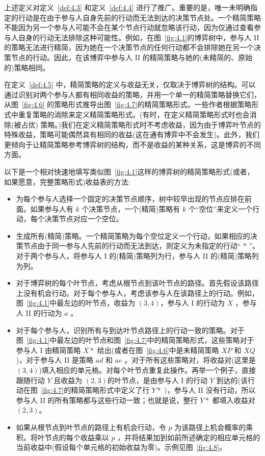 上述定义对定义~\ref{def:4.3} 和定义~\ref{def:4.4} 进行了推广。重要的是，唯一未明确指定的行动是在由于参与人自身先前的行动而无法到达的决策节点处。一个精简策略不能因为另一个参与人可能不会在某个节点行动就忽略该行动，因为仅通过查看参与人自身的行动无法排除这种可能性。例如，在图~\ref{fig:4.1}的博弈树中，参与人 II 的策略无法进行精简，因为她在一个决策节点的任何行动都不会排除她在另一个决策节点的行动。因此，在该博弈中参与人 II 的精简策略与她的(未精简的、原始的)策略相同。

在定义~\ref{def:4.5} 中，精简策略的定义与收益无关，仅取决于博弈树的结构。可以通过识别对两个参与人都有相同收益的策略，并用一个单一的精简策略替换它们，从图~\ref{fig:4.6} 的策略形式推导出图~\ref{fig:4.7}的精简策略形式。一些作者根据策略形式中重复策略的消除来定义精简策略形式。(有时，在定义精简策略形式时也会消除(被占优) 策略。)我们在定义精简策略形式时不考虑收益，因为由于博弈叶节点的特殊收益，策略可能偶然具有相同的收益(这在通有博弈中不会发生)。此外，我们更倾向于让精简策略参考博弈树的结构，而不是收益的某种关系，这是博弈的不同方面。

以下是一个相对快速地填写类似图~\ref{fig:4.1}这样的博弈树的精简策略形式(或者，如果愿意，完整策略形式)收益表的方法:

\begin{itemize}
\item 为每个参与人选择一个固定的决策节点顺序，树中较早出现的节点应排在前面。如果参与人有 \(k\) 个决策节点，一个(精简)策略有 \(k\) 个“空位”来定义一个行动，每个决策节点对应一个空位。
\item 生成所有(精简)策略。一个精简策略为每个空位定义一个行动，如果相应的决策节点由于同一参与人先前的行动而无法到达，则定义为未指定的行动“ \(*\) ”。对于两个参与人，将参与人 I 的(精简)策略列为行，参与人 II 的(精简)策略列为列。
\item 对于博弈树的每个叶节点，考虑从根节点到该叶节点的路径。首先假设该路径上没有机会行动。对于每个参与人，考虑该参与人在该路径上的行动。例如，图~\ref{fig:4.1}中最左边的叶节点，收益为 $(3,4)$，参与人 I 的行动为 \(X\) ，参与人 II 的行动为 \(a\) 。
\item 对于每个参与人，识别所有与到达叶节点路径上的行动一致的策略。对于图~\ref{fig:4.1}中最左边的叶节点和图~\ref{fig:4.7}中的精简策略形式，这些策略对于参与人 \(\mathrm{I}\) 由精简策略 \(X *\) 给出(或者在图~\ref{fig:4.6}中是未精简策略 \({XP}\) 和 \({XQ}\) )，对于参与人 II 是策略 \({ad}\) 和 \({ae}\) 。对于所有这些策略对，将收益对(这里是$(3,4)$)填入相应的单元格。对每个叶节点重复此操作。再举一个例子，直接跟随行动 \(Y\) 且收益为 $(2,3)$的叶节点，是由参与人 I 的行动 \(Y\) 到达的(该行动在图~\ref{fig:4.7}的精简策略形式中定义了行 \(Y *\) )，参与人 II 没有行动，所以参与人 II 的所有策略都与这些行动一致；也就是说，整行 \(Y *\) 都填入收益对 $(2,3)$。
\item 如果从根节点到叶节点的路径上有机会行动，令 \(p\) 为该路径上机会概率的乘积。将叶节点的每个收益乘以 \(p\) ，并将结果加到如前所述确定的相应单元格的当前收益中(假设每个单元格的初始收益为零)。示例见图~\ref{fig:4.8}。
\end{itemize}

